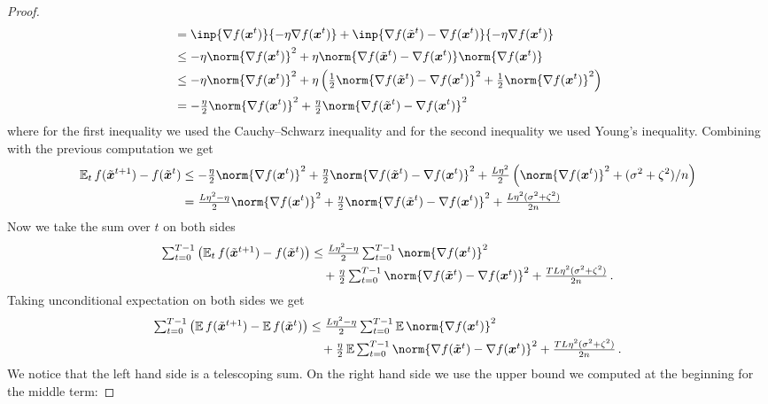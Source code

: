 \documentclass{article}
\begin{document}
\begin{proof}
\begin{align*}
     & =
    \inp{\nabla f(\xx^t)}{-\eta \nabla f(\xx^t)} +   \inp{\nabla f(\tilde \xx^t) - \nabla f(\xx^t)}{-\eta \nabla f(\xx^t)}
    \\
     & \leq
    -\eta \norm{\nabla f(\xx^t)}^2 + \eta \norm{\nabla f(\tilde \xx^t) - \nabla f(\xx^t)} \norm{\nabla f(\xx^t)}
    \\
     & \leq
    -\eta \norm{\nabla f(\xx^t)}^2 + \eta \left( \tfrac{1}{2} \norm{\nabla f(\tilde \xx^t) - \nabla f(\xx^t)}^2 + \tfrac{1}{2} \norm{\nabla f(\xx^t)}^2 \right)
    \\
     & =
    -\tfrac{\eta}{2} \norm{\nabla f(\xx^t)}^2 + \tfrac{\eta}{2} \norm{\nabla f(\tilde \xx^t) - \nabla f(\xx^t)}^2
  \end{align*}
  where for the first inequality we used the Cauchy--Schwarz inequality and for the second inequality we used Young's inequality. Combining with the previous computation we get
  \begin{align*}
    \E_t f(\tilde \xx^{t+1})  - f(\tilde \xx^t)
     & \leq
    -\tfrac{\eta}{2} \norm{\nabla f(\xx^t)}^2 + \tfrac{\eta}{2} \norm{\nabla f(\tilde \xx^t) - \nabla f(\xx^t)}^2 + \tfrac{L \eta^2}{2} \left( \norm{\nabla f(\xx^t)}^2  + (\sigma^2+\zeta^2)/n\right)
    \\
     & =
    \tfrac{L\eta^2-\eta}{2} \norm{\nabla f(\xx^t)}^2 + \tfrac{\eta}{2} \norm{\nabla f(\tilde \xx^t) - \nabla f(\xx^t)}^2 + \tfrac{L \eta^2 (\sigma^2+\zeta^2)}{2n}
  \end{align*}
  Now we take the sum over $t$ on both sides
  \begin{align*}
    \tsum_{t=0}^{T-1} \left( \E_t f(\tilde \xx^{t+1}) - f(\tilde \xx^t) \right)
     & \leq
    \tfrac{L\eta^2-\eta}{2} \tsum_{t=0}^{T-1} \norm{\nabla f(\xx^t)}^2 
    \\
     & \quad 
    + \tfrac{\eta}{2} \tsum_{t=0}^{T-1} \norm{\nabla f(\tilde \xx^t) - \nabla f(\xx^t)}^2 + \tfrac{T L \eta^2 (\sigma^2+\zeta^2)}{2n} \, .
  \end{align*}
  Taking unconditional expectation on both sides we get
  \begin{align*}
    \tsum_{t=0}^{T-1} \left(\E f(\tilde \xx^{t+1}) - \E f(\tilde \xx^t)\right)
     & \leq
    \tfrac{L\eta^2-\eta}{2} \tsum_{t=0}^{T-1} \E \norm{\nabla f(\xx^t)}^2
    \\
     & \quad
    + \tfrac{\eta}{2} \E \tsum_{t=0}^{T-1} \norm{\nabla f(\tilde \xx^t) - \nabla f(\xx^t)}^2 
    + \tfrac{T L \eta^2 (\sigma^2+\zeta^2)}{2n}
    \, .
  \end{align*}
  We notice that the left hand side is a telescoping sum. On the right hand side we use the upper bound we computed at the beginning for the middle term:

\end{proof}
\end{document}
